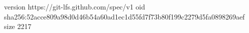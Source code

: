 version https://git-lfs.github.com/spec/v1
oid sha256:52acce809a98d0d46b54a60ad1ec1d55fd7f73b80f199c2279d5fa0898269aef
size 2217
